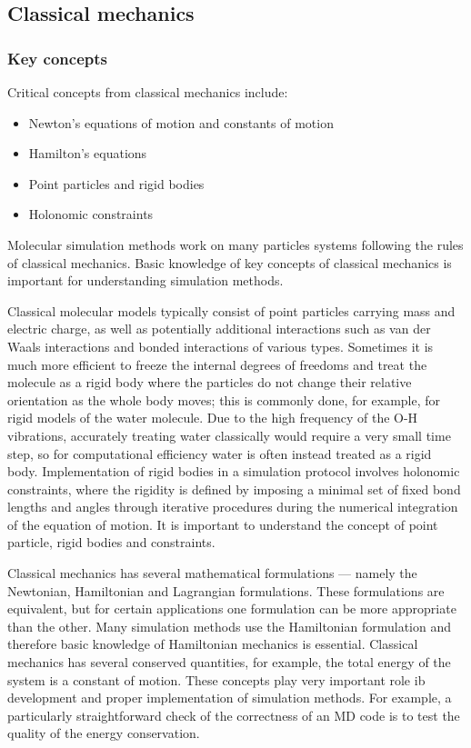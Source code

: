 \documentclass[9pt,bestpractices]{livecoms}
\begin{document}
\subsection{Classical mechanics}
\label{sec:classical_mechanics}
\subsubsection{Key concepts}

Critical concepts from classical mechanics include:
\begin{itemize}
\item Newton's equations of motion and constants of motion
\item Hamilton's equations
\item Point particles and rigid bodies
\item Holonomic constraints
\end{itemize}

Molecular simulation methods work on many particles systems following the rules of classical mechanics. 
Basic knowledge of key concepts of classical mechanics is important for understanding simulation methods.

Classical molecular models typically consist of point particles carrying mass and electric charge, as well as potentially additional interactions such as van der Waals interactions and bonded interactions of various types.
Sometimes it is much more efficient to freeze the internal degrees of freedoms and treat the molecule as a rigid body where the particles do not change their relative orientation as the whole body moves; this is commonly done, for example, for rigid models of the water molecule.
Due to the high frequency of the O-H vibrations, accurately treating water classically would require a very small time step, so for computational efficiency water is often instead treated as a rigid body.
Implementation of rigid bodies in a simulation protocol involves holonomic constraints, where the rigidity is defined by imposing a minimal set of fixed bond lengths and angles through iterative procedures during the numerical integration of the equation of motion.
It is important to understand the concept of point particle, rigid bodies and constraints.

Classical mechanics has several mathematical formulations --- namely the Newtonian, Hamiltonian and Lagrangian formulations.
These formulations are equivalent, but for certain applications one formulation can be more appropriate than the other. 
Many simulation methods use the Hamiltonian formulation and therefore basic knowledge of Hamiltonian mechanics is essential.
Classical mechanics has several conserved quantities, for example, the total energy of the system is a constant of motion.
These concepts play very important role ib development and proper implementation of simulation methods.
For example, a particularly straightforward check of the correctness of an MD code is to test the quality of the energy conservation.
\end{document}
